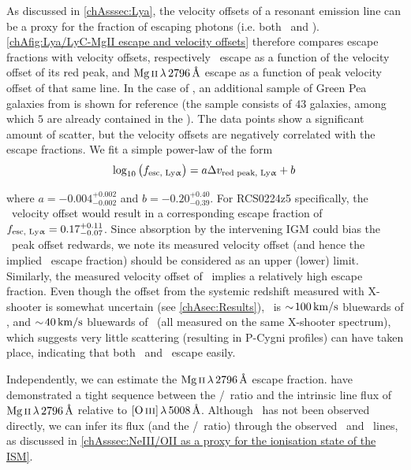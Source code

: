 As discussed in \cref{chAsssec:Lya}, the velocity offsets of a resonant emission line can be a proxy for the fraction of escaping photons (i.e. both \lya\ and \MgII). \cref{chAfig:Lya/LyC-MgII escape and velocity offsets} therefore compares escape fractions with velocity offsets, respectively \lya\ escape as a function of the velocity offset of its red peak, and $\MgII \, \lambda \, 2796 \, \Angstrom$ escape as a function of peak velocity offset of that same line. In the case of \lya, an additional sample of Green Pea galaxies from \citet{2016ApJ...820..130Y, 2017ApJ...844..171Y} is shown for reference (the sample consists of $43$ galaxies, among which $5$ are already contained in the \Isample). The data points show a significant amount of scatter, but the velocity offsets are negatively correlated with the escape fractions. We fit a simple power-law of the form
\begin{equation}
    \log_{10} \left( f_\text{esc, {Ly\ensuremath{\upalpha}}} \right) = a \Delta v_\text{red peak, {Ly\ensuremath{\upalpha}}} + b \, 
\end{equation}

\noindent where $a = -0.004_{-0.002}^{+0.002}$ and $b = -0.20_{-0.39}^{+0.40}$. For RCS0224z5 specifically, the \lya\ velocity offset would result in a corresponding escape fraction of $f_\text{esc, {Ly\ensuremath{\upalpha}}} = 0.17_{-0.07}^{+0.11}$. Since absorption by the intervening IGM could bias the \lya\ peak offset redwards, we note its measured velocity offset (and hence the implied \lya\ escape fraction) should be considered as an upper (lower) limit. Similarly, the measured velocity offset of \MgII\ implies a relatively high escape fraction. Even though the offset from the systemic redshift measured with X-shooter is somewhat uncertain (see \cref{chAsec:Results}), \MgII\ is $\sim \! 100 \, \mathrm{km/s}$ bluewards of \lya, and $\sim \! 40 \, \mathrm{km/s}$ bluewards of \CIV\ (all measured on the same X-shooter spectrum), which suggests very little scattering (resulting in P-Cygni profiles) can have taken place, indicating that both \lya\ and \MgII\ escape easily.

Independently, we can estimate the $\MgII \, \lambda \, 2796 \, \Angstrom$ escape fraction. \citet{2018ApJ...855...96H} have demonstrated a tight sequence between the \OIIIf/\OII\ ratio and the intrinsic line flux of $\MgII \, \lambda \, 2796 \, \Angstrom$ relative to $\OIIIf \, \lambda \, 5008 \, \Angstrom$. Although \OIIIf\ has not been observed directly, we can infer its flux (and the \OIIIf/\OII\ ratio) through the observed \NeIII\ and \OII\ lines, as discussed in \cref{chAsssec:NeIII/OII as a proxy for the ionisation state of the ISM}.

